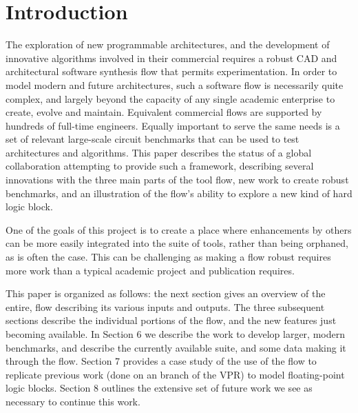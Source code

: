 \section{Introduction}

The exploration of new programmable architectures, and the development of innovative algorithms involved
in their commercial requires a robust CAD and architectural software synthesis flow that permits experimentation.
In order to model modern and future architectures, such a software flow is necessarily quite complex, and largely beyond the
capacity of any single academic enterprise to create, evolve and maintain.  Equivalent commercial flows are
supported by hundreds of full-time engineers.  Equally important to serve the same needs is a set of relevant
large-scale circuit benchmarks that can be used to test architectures and algorithms.
This paper describes the status of a global collaboration attempting to provide such a framework, describing
several innovations with the three main parts of the tool flow, new work to create robust benchmarks, and 
an illustration of the flow's ability to explore a new kind of hard logic block.

One of the goals of this project is to create a place where enhancements by others can be more easily integrated
into the suite of tools, rather than being orphaned, as is often the case.  This can be challenging as making
a flow robust requires more work than a typical academic project and publication requires.

This paper is organized as follows:  the next section gives an overview of the entire, flow describing its various inputs
and outputs.  The three subsequent sections describe the individual portions of the flow, and the new features just
becoming available.  In Section 6 we describe the work to develop larger, modern benchmarks, and describe the currently
available suite, and some data making it through the flow.  Section 7 provides a case study of the use of the flow to replicate previous work (done on an branch
of the VPR\cite{betz_vpr99}) to model floating-point logic blocks.  Section 8 outlines the extensive set of future work we see as necessary
to continue this work.
